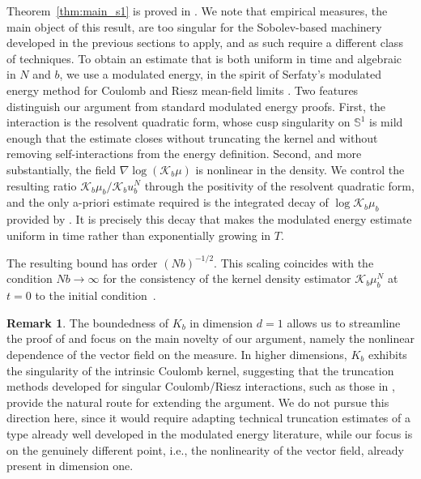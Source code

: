 \documentclass[11pt]{article}
\theoremstyle{definition}
\newtheorem{remark}[theorem]{Remark}
\newcommand{\Sphere}{\mathbb{S}}
\def\Kb{\mathcal K_b}
\begin{document}
Theorem~\ref{thm:main_s1} is proved in .
We note that empirical measures, the main object of this result, are too singular for the Sobolev-based machinery  developed in the previous sections to apply, and as such require a different class of techniques. 
To obtain an
estimate that is both uniform in time and algebraic in $N$ and $b$, we use a
modulated energy, in the spirit of Serfaty's modulated energy method for
Coulomb and Riesz mean-field limits
\cite{serfaty2017mean,duerinckx_serfaty_2020}. 
Two features distinguish our argument from standard modulated energy proofs.
First, the interaction is the resolvent quadratic form, whose cusp singularity
on $\Sphere^1$ is mild enough that the estimate closes without truncating the
kernel and without removing self-interactions from the energy definition. Second, and more substantially, the field $\nabla\log(\Kb\mu)$ is
nonlinear in the density. We control the resulting ratio $\Kb\mu_b/\Kb u^N_b$  through the
positivity of the resolvent quadratic form, and the only a-priori estimate required is the
integrated decay of $\log \Kb\mu_b$ provided by . It is precisely this decay that
makes the modulated energy estimate uniform in time rather than exponentially
growing in $T$.




The resulting bound has order $(Nb)^{-1/2}$. This scaling coincides with the condition $Nb\to\infty$ for the consistency of the kernel density estimator $\Kb \mu^N_b$ at $t=0$ to the initial condition~\cite{Dev83}.




\begin{remark}
\label{rem:truncation}
The boundedness of $K_b$ in dimension $d=1$ allows us to streamline the proof of  and focus on the main novelty of our argument, namely the nonlinear dependence of the vector field on the measure.
In higher dimensions, \(K_b\) exhibits the singularity of the intrinsic Coulomb kernel, suggesting that the truncation methods developed for singular Coulomb/Riesz interactions, such as those in \cite{duerinckx_serfaty_2020}, provide the natural route for extending the argument. We do not pursue this direction here, since it would require
adapting technical truncation estimates of a type already well developed in the
modulated energy literature, while our focus is on the genuinely different
point, i.e., the nonlinearity of the vector field, already present in dimension one.
\end{remark}
\end{document}
